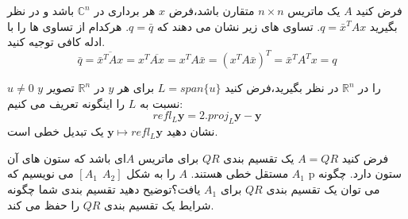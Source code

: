 \documentclass{article}
\begin{document}
	
	فرض کنید 
	$A$
	یک ماتریس 
	$n\times n$
	متقارن باشد،فرض 
	$x$
	هر برداری در 
	$\mathbb{C}^n$
	باشد و در نظر بگیرید 
	$q=\bar{x}^TAx$.
	تساوی های زیر نشان می دهند که 
	$q=\bar{q}$.
	هرکدام از تساوی ها را با ادله کافی توجیه کنید.
	$$\bar{q}=\overline{\bar{x}^TAx}=x^T\overline{Ax}=x^TA\bar{x}=(x^TA\bar{x})^T=\bar{x}^TA^Tx=q$$
	
	
	
	$u\neq 0$
	را در 
	$\mathbb{R}^n$
	در نظر بگیرید،فرض کنید 
	$L=span\{u\}$
	برای هر 
	$y$
	در 
	$\mathbb{R}^n$
	تصویر 
	$y$
	نسبت به 
	$L$
	را اینگونه تعریف می کنیم:
	$$refl_L \boldsymbol{y}=2.proj_L\boldsymbol{y}-\boldsymbol{y}$$
	نشان دهید 
	$\boldsymbol{y}\mapsto refl_L\boldsymbol{y}$
	یک تبدیل خطی است.
	
	
	 فرض کنید 
	$A=QR$
	یک تقسیم بندی 
	$QR$
	برای ماتریس 
	$A$ای
	باشد که ستون های آن مستقل خطی هستند.
	$A$
	را به شکل 
	$[A_1 \ \ A_2]$
	می نویسیم که 
	$A_1$
	p ستون دارد.
	چگونه می توان یک تقسیم بندی 
	$QR$
	برای 
	$A_1$
	یافت؟توضیح دهید تقسیم بندی شما چگونه شرایط یک تقسیم بندی 
	$QR$
	را حفظ می کند.
	
	
\end{document}
